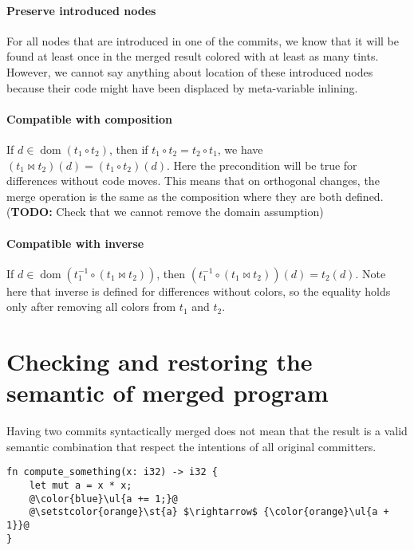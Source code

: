 \documentclass[a4paper,11pt]{article}
\newcommand\merge{\mathbin{\Join}}
\DeclareMathOperator\dom{dom}
\newcommand\yrg[1]{{\color{red}{(\textbf{YRG:} #1)}}}
\newcommand\todo[1]{{\color{teal}(\textbf{TODO:} #1)}}
\begin{document}
\paragraph{Preserve introduced nodes}
For all nodes that are introduced in one of the commits, we know that
it will be found at least once in the merged result colored with at
least as many tints. However, we cannot say anything about location of
these introduced nodes because their code might have been displaced by
meta-variable inlining.

\paragraph{Compatible with composition}
If $d \in \dom(t_1 \circ t_2)$, then if $t_1 \circ t_2 = t_2 \circ
t_1$, we have $(t_1 \merge t_2)(d) = (t_1 \circ t_2)(d)$. Here the
precondition will be true for differences without code moves. This
means that on orthogonal changes, the merge operation is the same as
the composition where they are both defined. \todo{Check that we
  cannot remove the domain assumption}

\paragraph{Compatible with inverse}
If $d \in \dom(t_1^{-1} \circ (t_1 \merge t_2))$, then $(t_1^{-1}
\circ (t_1 \merge t_2))(d) = t_2(d)$. Note here that inverse is
defined for differences without colors, so the equality holds only
after removing all colors from $t_1$ and $t_2$.

\section{Checking and restoring the semantic of merged program}
\label{sec:semantic-merge}

Having two commits syntactically merged does not mean that the result
is a valid semantic combination that respect the intentions of all
original committers. \yrg{Give an example.}

\begin{lstlisting}[label=lst:double-incr, caption={Double fix of the same function by different commits. The syntactic fusion does not create a conflict be semantically we can create a new bug here.}]
fn compute_something(x: i32) -> i32 {
    let mut a = x * x;
    @\color{blue}\ul{a += 1;}@
    @\setstcolor{orange}\st{a} $\rightarrow$ {\color{orange}\ul{a + 1}}@
}
\end{lstlisting}
\end{document}
